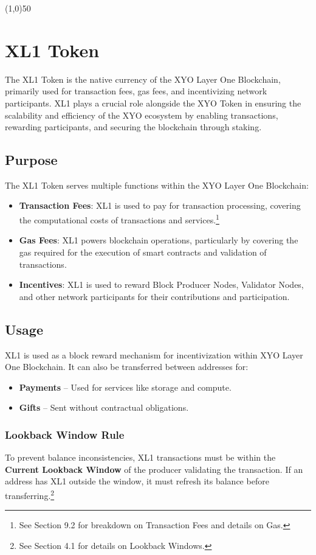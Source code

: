 \documentclass{article}
\begin{document}
\begin{center}
    \line(1,0){50}
\end{center}

\section{XL1 Token}
The XL1 Token is the native currency of the XYO Layer One Blockchain, primarily
used for transaction fees, gas fees, and incentivizing network participants.
XL1 plays a crucial role alongside the XYO Token in ensuring the scalability
and efficiency of the XYO ecosystem by enabling transactions, rewarding
participants, and securing the blockchain through staking.

\subsection{Purpose}
The XL1 Token serves multiple functions within the XYO Layer One Blockchain:

\begin{itemize}
    \item \textbf{Transaction Fees}: XL1 is used to pay for transaction processing, covering the computational costs of transactions and services.\footnote{See Section 9.2 for breakdown on Transaction Fees and details on Gas.}
    \item \textbf{Gas Fees}: XL1 powers blockchain operations, particularly by covering the gas required for the execution of smart contracts and validation of transactions.
    \item \textbf{Incentives}: XL1 is used to reward Block Producer Nodes, Validator Nodes, and other network participants for their contributions and participation.
\end{itemize}

\subsection{Usage}
XL1 is used as a block reward mechanism for incentivization within XYO Layer
One Blockchain. It can also be transferred between addresses for:
\begin{itemize}
    \item \textbf{Payments} – Used for services like storage and compute.
    \item \textbf{Gifts} – Sent without contractual obligations.
\end{itemize}

\subsubsection{Lookback Window Rule}
To prevent balance inconsistencies, XL1 transactions must be within the
\textbf{Current Lookback Window} of the producer validating the transaction. If
an address has XL1 outside the window, it must refresh its balance before
transferring.\footnote{See Section 4.1 for details on Lookback Windows.}
\end{document}

